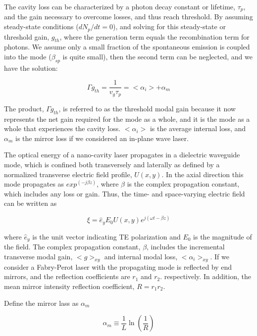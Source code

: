 The cavity loss can be characterized by a photon decay constant or lifetime,
$\tau_p$, and the gain necessary to overcome losses, and thus reach threshold.
By assuming steady-state conditions (\ie $dN_p/dt = 0$), and solving for this
steady-state or threshold gain, $g_{th}$, where the generation term equals the
recombination term for photons. We assume only a small fraction of the
spontaneous emission is coupled into the mode (\ie $\beta_{sp}$ is quite
small), then the second term can be neglected, and we have the solution:

\begin{equation}
  \Gamma{g_{th}} = \frac{1}{v_g\tau_p} = <\alpha_i> + \alpha_m
\end{equation}

The product, $\Gamma{g_{th}}$, is referred to as the threshold modal gain
because it now represents the net gain required for the mode as a whole, and it
is the mode as a whole that experiences the cavity loss. $<\alpha_i>$ is the
average internal loss, and $\alpha_m$ is the mirror loss if we considered an
in-plane wave laser.

The optical energy of a nano-cavity laser propagates in a dielectric waveguide
mode, which is confined both transversely and laterally as defined by a
normalized transverse electric field profile, $U(x,y)$. In the axial direction
this mode propagates as $exp^{(-j\beta z)}$, where $\beta$ is the complex
propagation constant, which includes any loss or gain. Thus, the time- and
space-varying electric field can be written as

\begin{equation}
  \xi = \hat{e}_{y}E_{0}U(x,y)e^{j(\omega t- \beta z)}
\end{equation}

where $\hat{e}_y$ is the unit vector indicating TE polarization and $E_0$ is
the magnitude of the field. The complex propagation constant, $\beta$, includes
the incremental transverse modal gain, $<g>_{xy}$ and internal modal loss,
$<\alpha_i>_{xy}$. If we consider a Fabry-Perot laser with the propagating mode
is reflected by end mirrors, and the reflection coefficients are $r_1$ and
$r_2$. respectively. In addition, the mean mirror intensity reflection coefficient, $R = r_1r_2$.

Define the mirror lass as $\alpha_m$

\begin{equation}
  \alpha_m \equiv \frac{1}{L}\ln(\frac{1}{R})
\end{equation}

